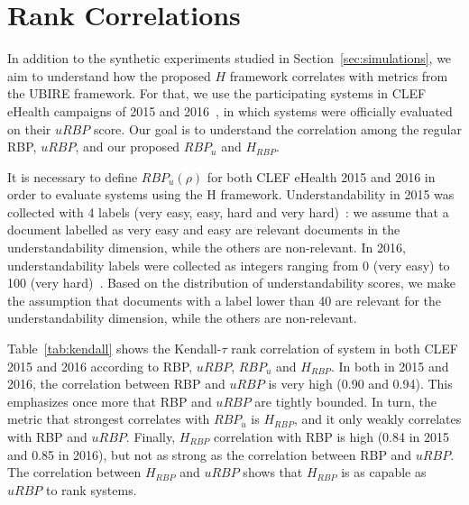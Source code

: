 



\section{Rank Correlations} %
\label{sec:clef}

In addition to the synthetic experiments studied in Section~\ref{sec:simulations}, we aim to understand how the proposed $H$ framework correlates with metrics from the UBIRE framework.
For that, we use the participating systems in CLEF eHealth campaigns of 2015 and 2016~\cite{clefIR15,clefIR16}, in which systems were officially evaluated on their $uRBP$ score.
Our goal is to understand the correlation among the regular RBP, $uRBP$, and our proposed $RBP_u$ and $H_{RBP}$.

It is necessary to define $RBP_u(\rho)$ for both CLEF eHealth 2015 and 2016 in order to evaluate systems using the H framework. 
Understandability in 2015 was collected with 4 labels (very easy, easy, hard and very hard)~\cite{clefIR15}: we assume that a document labelled as very easy and easy are relevant documents in the understandability dimension, while the others are non-relevant.
In 2016, understandability labels were collected as integers ranging from 0 (very easy) to 100 (very hard)~\cite{clefIR16}. Based on the distribution of understandability scores, we make the assumption that documents with a label lower than 40 are relevant for the understandability dimension, while the others are non-relevant.

Table~\ref{tab:kendall} shows the Kendall-$\tau$ rank correlation of system in both CLEF 2015 and 2016 according to RBP, $uRBP$, $RBP_u$ and $H_{RBP}$. 
In both in 2015 and 2016, the correlation between RBP and $uRBP$ is very high (0.90 and 0.94). This emphasizes once more that RBP and $uRBP$ are tightly bounded.
In turn, the metric that strongest correlates with $RBP_u$ is $H_{RBP}$, and it only weakly correlates with RBP and $uRBP$.
Finally, $H_{RBP}$ correlation with RBP is high (0.84 in 2015 and 0.85 in 2016), but not as strong as the correlation between RBP and $uRBP$.
The correlation between $H_{RBP}$ and $uRBP$ shows that $H_{RBP}$ is as capable as $uRBP$ to rank systems.

 
